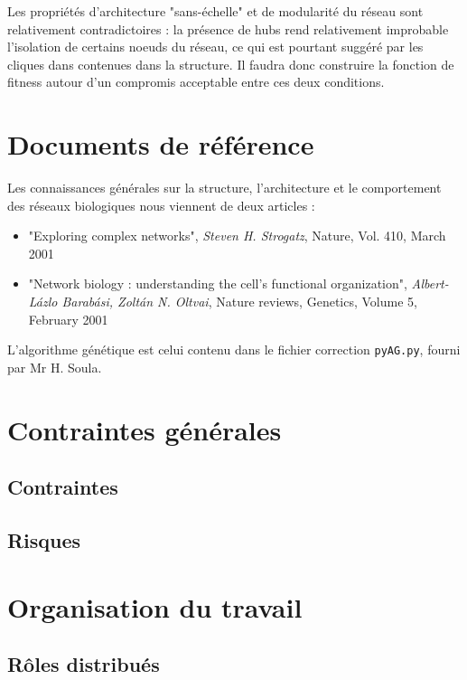 \medskip
Les propriétés d'architecture "sans-échelle" et de modularité du réseau sont relativement contradictoires : la présence de hubs rend relativement improbable l'isolation de certains noeuds du réseau, ce qui est pourtant suggéré par les cliques dans contenues dans la structure. Il faudra donc construire la fonction de fitness autour d'un compromis acceptable entre ces deux conditions.

\section{Documents de référence}
Les connaissances générales sur la structure, l'architecture et le comportement des réseaux biologiques nous viennent de deux articles :

\begin{itemize}
	\item "Exploring complex networks", \textit{Steven H. Strogatz}, Nature, Vol. 410, March 2001
	\item "Network biology : understanding the cell's functional organization", \textit{Albert-L\'{a}zlo Barab\'{a}si, Zolt\'{a}n N. Oltvai}, Nature reviews, Genetics, Volume 5, February 2001\medskip
\end{itemize}


L'algorithme génétique est celui contenu dans le fichier correction \texttt{pyAG.py}, fourni par Mr H. Soula.
\section{Contraintes générales}

\subsection{Contraintes}

\subsection{Risques}

\section{Organisation du travail}
\subsection{Rôles distribués}

